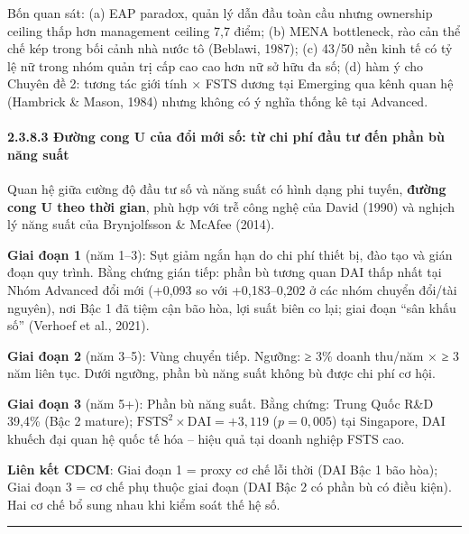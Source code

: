\documentclass[
  a4paper,
  13pt]{extreport}
\begin{document}
Bốn quan sát: (a) EAP paradox, quản lý dẫn đầu toàn cầu nhưng ownership
ceiling thấp hơn management ceiling 7,7 điểm; (b) MENA bottleneck, rào
cản thể chế kép trong bối cảnh nhà nước tô (Beblawi, 1987); (c) 43/50
nền kinh tế có tỷ lệ nữ trong nhóm quản trị cấp cao cao hơn nữ sở hữu đa
số; (d) hàm ý cho Chuyên đề 2: tương tác giới tính × FSTS dương tại
Emerging qua kênh quan hệ (Hambrick \& Mason, 1984) nhưng không có ý
nghĩa thống kê tại Advanced.

\hypertarget{ux111ux1b0ux1eddng-cong-u-cux1ee7a-ux111ux1ed5i-mux1edbi-sux1ed1-tux1eeb-chi-phuxed-ux111ux1ea7u-tux1b0-ux111ux1ebfn-phux1ea7n-buxf9-nux103ng-suux1ea5t}{%
\paragraph{2.3.8.3 Đường cong U của đổi mới số: từ chi phí đầu tư đến
phần bù năng
suất}\label{ux111ux1b0ux1eddng-cong-u-cux1ee7a-ux111ux1ed5i-mux1edbi-sux1ed1-tux1eeb-chi-phuxed-ux111ux1ea7u-tux1b0-ux111ux1ebfn-phux1ea7n-buxf9-nux103ng-suux1ea5t}}

Quan hệ giữa cường độ đầu tư số và năng suất có hình dạng phi tuyến,
\textbf{đường cong U theo thời gian}, phù hợp với trễ công nghệ của
David (1990) và nghịch lý năng suất của Brynjolfsson \& McAfee (2014).

\textbf{Giai đoạn 1} (năm 1--3): Sụt giảm ngắn hạn do chi phí thiết bị,
đào tạo và gián đoạn quy trình. Bằng chứng gián tiếp: phần bù tương quan
DAI thấp nhất tại Nhóm Advanced đổi mới (+0,093 so với +0,183--0,202 ở
các nhóm chuyển đổi/tài nguyên), nơi Bậc 1 đã tiệm cận bão hòa, lợi suất
biên co lại; giai đoạn ``sân khấu số'' (Verhoef et al., 2021).

\textbf{Giai đoạn 2} (năm 3--5): Vùng chuyển tiếp. Ngưỡng: ≥ 3\% doanh
thu/năm × ≥ 3 năm liên tục. Dưới ngưỡng, phần bù năng suất không bù được
chi phí cơ hội.

\textbf{Giai đoạn 3} (năm 5+): Phần bù năng suất. Bằng chứng: Trung Quốc
R\&D 39,4\% (Bậc 2 mature);
\(\mathrm{FSTS}^2\times\mathrm{DAI} = +3{,}119\) (\(p = 0{,}005\)) tại
Singapore, DAI khuếch đại quan hệ quốc tế hóa -- hiệu quả tại doanh
nghiệp FSTS cao.

\textbf{Liên kết CDCM}: Giai đoạn 1 = proxy cơ chế lỗi thời (DAI Bậc 1
bão hòa); Giai đoạn 3 = cơ chế phụ thuộc giai đoạn (DAI Bậc 2 có phần bù
có điều kiện). Hai cơ chế bổ sung nhau khi kiểm soát thế hệ số.

\begin{center}\rule{0.5\linewidth}{0.5pt}\end{center}
\end{document}
